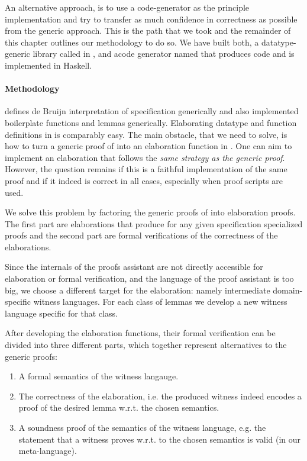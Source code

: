 An alternative approach, is to use a code-generator as the principle
implementation and try to transfer as much confidence in correctness as possible
from the generic approach. This is the path that we took and the remainder of
this chapter outlines our methodology to do so. We have built both, a
datatype-generic library called \Loom in \Coq, and acode generator named \Needle
that produces \Coq code and is implemented in Haskell.


\paragraph{Methodology}
\Loom defines de Bruijn interpretation of \Knot specification generically and
also implemented boilerplate functions and lemmas generically. Elaborating
datatype and function definitions in \Needle is comparably easy. The main
obstacle, that we need to solve, is how to turn a generic proof of \Loom into an
elaboration function in \Needle. One can aim to implement an elaboration that
follows the \emph{same strategy as the generic proof}. However, the question
remains if this is a faithful implementation of the same proof and if it indeed
is correct in all cases, especially when proof scripts are used.

We solve this problem by factoring the generic proofs of \Loom into elaboration
proofs. The first part are elaborations that produce for any given specification
specialized proofs and the second part are formal verifications of the
correctness of the elaborations.

Since the internals of the proofs assistant are not directly accessible for
elaboration or formal verification, and the language of the proof assistant is
too big, we choose a different target for the elaboration: namely intermediate
domain-specific witness languages. For each class of lemmas we develop a new
witness language specific for that class.

After developing the elaboration functions, their formal verification can be
divided into three different parts, which together represent alternatives to the
generic proofs:
\begin{enumerate}
\item A formal semantics of the witness langauge.
\item The correctness of the elaboration, i.e. the produced witness indeed
  encodes a proof of the desired lemma w.r.t. the chosen semantics.
\item A soundness proof of the semantics of the witness language, e.g. the
  statement that a witness proves w.r.t. to the chosen semantics is valid (in
  our meta-language).
\end{enumerate}

